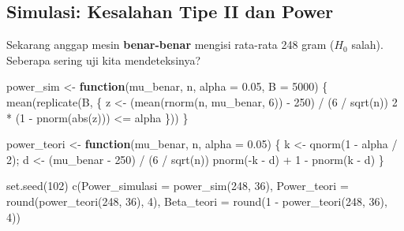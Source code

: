 \documentclass[
  indonesian,
  letterpaper,
]{book}
\newenvironment{Shaded}{\begin{snugshade}}{\end{snugshade}}
\newcommand{\AttributeTok}[1]{\textcolor[rgb]{0.40,0.45,0.13}{#1}}
\newcommand{\ControlFlowTok}[1]{\textcolor[rgb]{0.00,0.23,0.31}{\textbf{#1}}}
\newcommand{\DecValTok}[1]{\textcolor[rgb]{0.68,0.00,0.00}{#1}}
\newcommand{\FloatTok}[1]{\textcolor[rgb]{0.68,0.00,0.00}{#1}}
\newcommand{\FunctionTok}[1]{\textcolor[rgb]{0.28,0.35,0.67}{#1}}
\newcommand{\NormalTok}[1]{\textcolor[rgb]{0.00,0.23,0.31}{#1}}
\newcommand{\OtherTok}[1]{\textcolor[rgb]{0.00,0.23,0.31}{#1}}
\newcommand{\SpecialCharTok}[1]{\textcolor[rgb]{0.37,0.37,0.37}{#1}}
\begin{document}
\subsection{Simulasi: Kesalahan Tipe II dan
Power}\label{simulasi-kesalahan-tipe-ii-dan-power}

Sekarang anggap mesin \textbf{benar-benar} mengisi rata-rata 248 gram
(\(H_0\) salah). Seberapa sering uji kita mendeteksinya?

\begin{Shaded}
\begin{Highlighting}[]
\NormalTok{power\_sim   }\OtherTok{\textless{}{-}} \ControlFlowTok{function}\NormalTok{(mu\_benar, n, }\AttributeTok{alpha =} \FloatTok{0.05}\NormalTok{, }\AttributeTok{B =} \DecValTok{5000}\NormalTok{) \{}
  \FunctionTok{mean}\NormalTok{(}\FunctionTok{replicate}\NormalTok{(B, \{}
\NormalTok{    z       }\OtherTok{\textless{}{-}}\NormalTok{ (}\FunctionTok{mean}\NormalTok{(}\FunctionTok{rnorm}\NormalTok{(n, mu\_benar, }\DecValTok{6}\NormalTok{)) }\SpecialCharTok{{-}} \DecValTok{250}\NormalTok{) }\SpecialCharTok{/}\NormalTok{ (}\DecValTok{6} \SpecialCharTok{/} \FunctionTok{sqrt}\NormalTok{(n))}
    \DecValTok{2} \SpecialCharTok{*}\NormalTok{ (}\DecValTok{1} \SpecialCharTok{{-}} \FunctionTok{pnorm}\NormalTok{(}\FunctionTok{abs}\NormalTok{(z))) }\SpecialCharTok{\textless{}=}\NormalTok{ alpha}
\NormalTok{  \}))}
\NormalTok{\}}

\NormalTok{power\_teori }\OtherTok{\textless{}{-}} \ControlFlowTok{function}\NormalTok{(mu\_benar, n, }\AttributeTok{alpha =} \FloatTok{0.05}\NormalTok{) \{}
\NormalTok{  k         }\OtherTok{\textless{}{-}} \FunctionTok{qnorm}\NormalTok{(}\DecValTok{1} \SpecialCharTok{{-}}\NormalTok{ alpha }\SpecialCharTok{/} \DecValTok{2}\NormalTok{); d }\OtherTok{\textless{}{-}}\NormalTok{ (mu\_benar }\SpecialCharTok{{-}} \DecValTok{250}\NormalTok{) }\SpecialCharTok{/}\NormalTok{ (}\DecValTok{6} \SpecialCharTok{/} \FunctionTok{sqrt}\NormalTok{(n))}
  \FunctionTok{pnorm}\NormalTok{(}\SpecialCharTok{{-}}\NormalTok{k }\SpecialCharTok{{-}}\NormalTok{ d) }\SpecialCharTok{+} \DecValTok{1} \SpecialCharTok{{-}} \FunctionTok{pnorm}\NormalTok{(k }\SpecialCharTok{{-}}\NormalTok{ d)}
\NormalTok{\}}

\FunctionTok{set.seed}\NormalTok{(}\DecValTok{102}\NormalTok{)}
\FunctionTok{c}\NormalTok{(}\AttributeTok{Power\_simulasi =} \FunctionTok{power\_sim}\NormalTok{(}\DecValTok{248}\NormalTok{, }\DecValTok{36}\NormalTok{), }\AttributeTok{Power\_teori =} \FunctionTok{round}\NormalTok{(}\FunctionTok{power\_teori}\NormalTok{(}\DecValTok{248}\NormalTok{, }\DecValTok{36}\NormalTok{), }\DecValTok{4}\NormalTok{),}
  \AttributeTok{Beta\_teori =} \FunctionTok{round}\NormalTok{(}\DecValTok{1} \SpecialCharTok{{-}} \FunctionTok{power\_teori}\NormalTok{(}\DecValTok{248}\NormalTok{, }\DecValTok{36}\NormalTok{), }\DecValTok{4}\NormalTok{))}
\end{Highlighting}
\end{Shaded}
\end{document}

